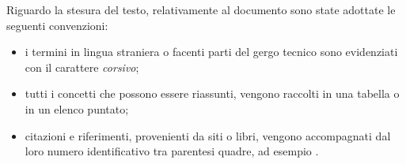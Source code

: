 Riguardo la stesura del testo, relativamente al documento sono state adottate le seguenti convenzioni:
\begin{itemize}
	\item i termini in lingua straniera o facenti parti del gergo tecnico sono evidenziati con il carattere \emph{corsivo};
	\item tutti i concetti che possono essere riassunti, vengono raccolti in una tabella o in un elenco puntato;
	\item citazioni e riferimenti, provenienti da siti o libri, vengono accompagnati dal loro numero identificativo tra parentesi quadre, ad esempio \cite{site:junit-annotation}.
\end{itemize}